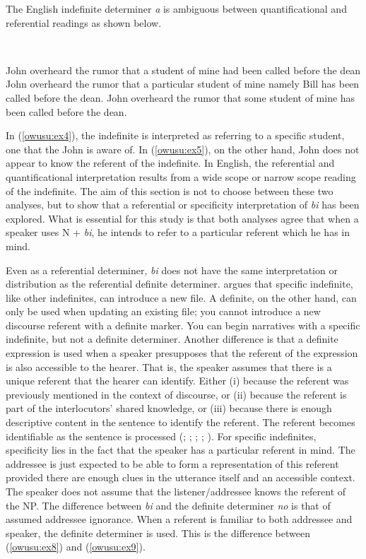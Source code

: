 \documentclass[output=paper,modfonts,nonflat,draftmode]{langsci/langscibook}
\begin{document}
The English indefinite determiner \emph{a} is ambiguous between quantificational and referential readings as shown below.

\ea
{}\\
\ea\label{owusu:ex3}

John overheard the rumor that a student of mine had been called before the dean
\ea \label{owusu:ex4} John overheard the rumor that a particular student of mine namely Bill has been called before the dean.
\ex \label{owusu:ex5} John overheard the rumor that some student of mine has been called before the dean.
\z\z 
\z 

In (\ref{owusu:ex4}), the indefinite is interpreted as referring to a specific student, one that the John is aware of. In (\ref{owusu:ex5}), on the other hand, John does not appear to know the referent of the indefinite. In English, the referential and quantificational interpretation results from a wide scope or narrow scope reading of the indefinite. 
The aim of this section is not to choose between these two analyses, but to show that a referential or specificity interpretation of \emph{bi} has been explored. What is essential for this study is that both analyses agree that when a speaker uses  N + \emph{bi}, he intends to refer to a particular referent which he has in mind.            


Even as a referential determiner, \emph{bi} does not have the same interpretation or distribution as the referential definite determiner. \citet{Heim1983} argues that specific indefinite, like other indefinites, can introduce a new file. A definite, on the other hand, can only be used when updating an existing file; you cannot introduce a new discourse referent with a definite marker. You can begin narratives with a specific indefinite, but not a definite determiner. Another difference is that a definite expression is used when a speaker presupposes that the referent of the expression is also accessible to the hearer. That is, the speaker assumes that there is a unique referent that the hearer can identify. Either (i) because the referent was previously mentioned in the context of discourse, or (ii) because the referent is part of the interlocutors’ shared knowledge, or (iii) because there is enough descriptive content in the sentence to identify the referent.  The referent becomes identifiable as the sentence is processed (\citealt[135]{Comrie1989}; \citealt[450]{Givón2001}; \citealt[277]{GundelEtAlZacharski1993}; \citealt[167--168]{Hawkins1978}; \citealt[263]{Payne1997}). For specific indefinites, specificity lies in the fact that the speaker has a particular referent in mind. The addressee is just expected to be able to form a representation of this referent provided there are enough clues in the utterance itself and an accessible context. The speaker does not assume that the listener/addressee knows the referent of the NP. The difference between \emph{bi} and the definite determiner \emph{no} is that of assumed addressee ignorance. When a referent is familiar to both addressee and speaker, the definite determiner is used. This is the difference between (\ref{owusu:ex8}) and (\ref{owusu:ex9}). 
\end{document}

